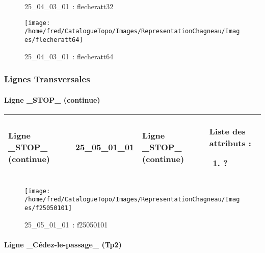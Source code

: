 \documentclass[12pt,titlepage]{book}
\begin{document}
\begin{figure}[h!]
\begin{minipage}[t]{3cm}
\begin{center}
      \caption[~25\_04\_03\_01]{\small{25\_04\_03\_01~:} \tiny{flecheratt32}}\label{flecheratt32}
    \end{center}
  \end{minipage}
  \begin{minipage}[t]{3cm}
    \begin{center}
      \texttt{[image: /home/fred/CatalogueTopo/Images/RepresentationChagneau/Images/flecheratt64]}
      \caption[~25\_04\_03\_01]{\small{25\_04\_03\_01~:} \tiny{flecheratt64}}\label{flecheratt64}
    \end{center}
  \end{minipage}
\end{figure}

\subsubsection{\large Lignes Transversales}
\paragraph{Ligne \_STOP\_ (continue)}
\noindent
\vspace{\baselineskip}

\renewcommand{\arraystretch}{1.2}
\begin{supertabular}{|p{10cm}|c|p{13cm}|p{12cm}|}
 Ligne \_STOP\_ (continue) & 25\_05\_01\_01 & Ligne \_STOP\_ (continue) & Liste des attributs :
\begin{enumerate}
  \item ?\end{enumerate}
\\
\hline
\end{supertabular}
\begin{figure}[h!]
  \hfill         %
  \begin{minipage}[t]{3cm}
    \begin{center}
      \texttt{[image: /home/fred/CatalogueTopo/Images/RepresentationChagneau/Images/f25050101]}
      \caption[~25\_05\_01\_01]{\small{25\_05\_01\_01~:} \tiny{f25050101}}\label{f25050101}
    \end{center}
  \end{minipage}
\end{figure}


\paragraph{Ligne \_Cédez-le-passage\_ (Tp2)}
\noindent
\vspace{\baselineskip}
\end{document}
